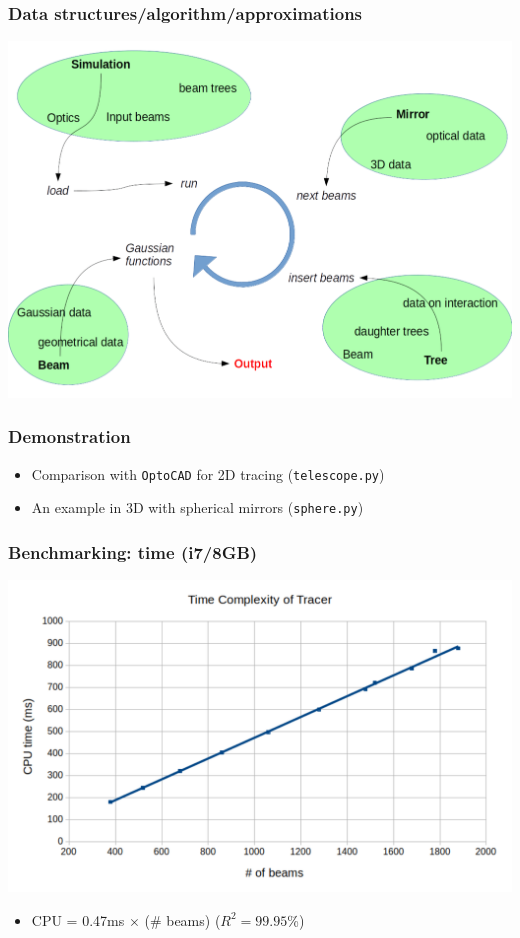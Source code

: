 \documentclass{beamer}
\begin{document}
\begin{frame}
\frametitle{Data structures/algorithm/approximations}
\begin{center}
\includegraphics[scale=0.35]{flow}
\end{center}

\end{frame}


\begin{frame}
\frametitle{Demonstration}
\begin{itemize}
\item Comparison with \texttt{OptoCAD} for 2D tracing (\texttt{telescope.py})
\item An example in 3D with spherical mirrors (\texttt{sphere.py})
\end{itemize}
\end{frame}


\begin{frame}
\frametitle{Benchmarking: time (i7/8GB)}

\begin{center}
\includegraphics[scale = .45]{timecomplexity.pdf}
\end{center}


\begin{itemize}
\item CPU = 0.47ms $\times$ (\# beams) ($R^2 = 99.95$\%)
\end{itemize}

\end{frame}
\end{document}
